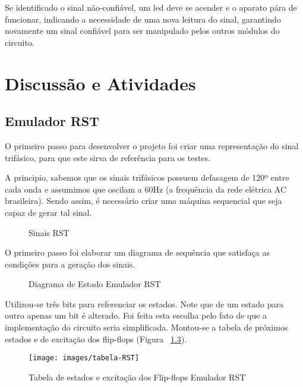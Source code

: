\documentclass[12pt,a4paper,openany]{abntex2}
\begin{document}
Se identificado o sinal não-confiável, um led deve se acender e o aparato pára de funcionar, indicando a necessidade de uma nova leitura do sinal, garantindo novamente um sinal confiável para
ser manipulado pelos outros módulos do circuito.

\chapter{Discussão e Atividades}

\section{Emulador RST}

O primeiro passo para desenvolver o projeto foi criar uma representação do sinal trifásico, para que este sirva de referência para os testes.

A principio, sabemos que os sinais trifásicos possuem defasagem de 120º entre cada onda e assumimos que oscilam a 60Hz (a frequência da rede elétrica AC brasileira). Sendo assim, é necessário criar uma máquina sequencial que seja capaz de gerar tal sinal.

\begin{figure}[!htp]
	\centering
	\caption{Sinais RST}
	\label{fig:sinais-rst}
\end{figure}

O primeiro passo foi elaborar um diagrama de sequência que satisfaça as condições para a geração dos sinais.

\begin{figure}[!htp]
	\centering
	\caption{Diagrama de Estado Emulador RST}
	\label{fig:disgrama-de-estado-EmuladorRST}
\end{figure}

Utilizou-se três bits para referenciar os estados. Note que de um estado para outro apenas um bit é alterado. Foi feita esta escolha pelo fato de que a implementação do circuito seria simplificada. Montou-se a tabela de próximos estados e de excitação dos flip-flops (Figura ~\ref{fig:tabela-RST}).

\begin{figure}[!htp]
	\centering
	\caption{Tabela de estados e excitação dos Flip-flops Emulador RST}
	\texttt{[image: images/tabela-RST]}
	\label{fig:tabela-RST}
\end{figure}
\end{document}
